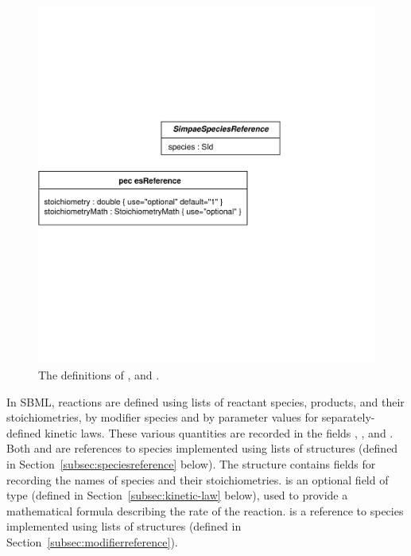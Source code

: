 \documentclass[10pt,twocolumntoc]{cekarticle}
\begin{document}
\begin{figure}[htb]
  \centering
  \includegraphics[scale = 0.68]{reaction}
  \caption{The definitions of ,  and
    .}
  \label{fig:reaction}
\end{figure}

In SBML, reactions are defined using lists of reactant species,
products, and their stoichiometries, by modifier species and by
parameter values for separately-defined kinetic laws.  These
various quantities are recorded in the fields ,
,  and .  Both
 and  are references to species
implemented using lists of  structures
(defined in Section~\ref{subsec:speciesreference} below).  The
 structure contains fields for recording
the names of species and their stoichiometries.
 is an optional field of type
 (defined in Section~\ref{subsec:kinetic-law}
below), used to provide a mathematical formula describing the rate
of the reaction.   is a reference to species
implemented using lists of  structures
(defined in Section~\ref{subsec:modifierreference}).
\end{document}
